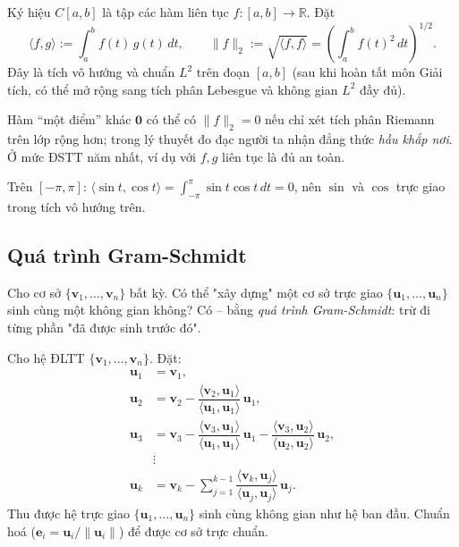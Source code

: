 \documentclass[12pt,a4paper]{article}
\begin{document}
\begin{dinhnghia}[title={Tích vô hướng chuẩn trên $C[a,b]$}]
Ký hiệu $C[a,b]$ là tập các hàm liên tục $f: [a, b] \to \mathbb{R}$. Đặt
\[
  \langle f, g \rangle := \int_a^b f(t)\, g(t)\, dt,\qquad \|f\|_2 := \sqrt{\langle f, f\rangle} = \left(\int_a^b f(t)^2\, dt\right)^{1/2}.
\]
Đây là tích vô hướng và chuẩn \textbf{$L^2$} trên đoạn $[a,b]$ (sau khi hoàn tất môn Giải tích, có thể mở rộng sang tích phân Lebesgue và không gian $L^2$ đầy đủ).
\end{dinhnghia}

\begin{luuy}
Hàm ``một điểm'' khác $\mathbf{0}$ có thể có $\|f\|_2 = 0$ nếu chỉ xét tích phân Riemann trên lớp rộng hơn; trong lý thuyết đo đạc người ta nhận đẳng thức \emph{hầu khắp nơi}. Ở mức ĐSTT năm nhất, ví dụ với $f, g$ liên tục là đủ an toàn.
\end{luuy}

\begin{vidu}
Trên $[-\pi, \pi]$: $\langle \sin t, \cos t\rangle = \int_{-\pi}^{\pi} \sin t \cos t\, dt = 0$, nên $\sin$ và $\cos$ trực giao trong tích vô hướng trên.
\end{vidu}

\subsection{Quá trình Gram-Schmidt}

\begin{dongco}
Cho cơ sở $\{\mathbf{v}_1, \ldots, \mathbf{v}_n\}$ bất kỳ. Có thể "xây dựng" một cơ sở trực giao $\{\mathbf{u}_1, \ldots, \mathbf{u}_n\}$ sinh cùng một không gian không? Có -- bằng \emph{quá trình Gram-Schmidt}: trừ đi từng phần "đã được sinh trước đó".
\end{dongco}

\begin{phuongphap}[title={Gram-Schmidt}]
Cho hệ ĐLTT $\{\mathbf{v}_1, \ldots, \mathbf{v}_n\}$. Đặt:
\begin{align*}
  \mathbf{u}_1 &= \mathbf{v}_1, \\
  \mathbf{u}_2 &= \mathbf{v}_2 - \dfrac{\langle \mathbf{v}_2, \mathbf{u}_1\rangle}{\langle \mathbf{u}_1, \mathbf{u}_1\rangle}\, \mathbf{u}_1, \\
  \mathbf{u}_3 &= \mathbf{v}_3 - \dfrac{\langle \mathbf{v}_3, \mathbf{u}_1\rangle}{\langle \mathbf{u}_1, \mathbf{u}_1\rangle}\, \mathbf{u}_1 - \dfrac{\langle \mathbf{v}_3, \mathbf{u}_2\rangle}{\langle \mathbf{u}_2, \mathbf{u}_2\rangle}\, \mathbf{u}_2, \\
  &\vdots \\
  \mathbf{u}_k &= \mathbf{v}_k - \sum_{j=1}^{k-1} \dfrac{\langle \mathbf{v}_k, \mathbf{u}_j\rangle}{\langle \mathbf{u}_j, \mathbf{u}_j\rangle}\, \mathbf{u}_j.
\end{align*}
Thu được hệ trực giao $\{\mathbf{u}_1, \ldots, \mathbf{u}_n\}$ sinh cùng không gian như hệ ban đầu. Chuẩn hoá ($\mathbf{e}_i = \mathbf{u}_i / \|\mathbf{u}_i\|$) để được cơ sở trực chuẩn.
\end{phuongphap}
\end{document}
